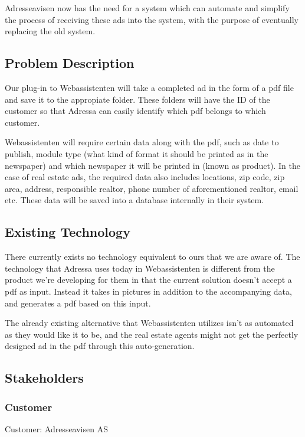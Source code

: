 Adresseavisen now has the need for a system which can automate and simplify the process of receiving these ads into the system, with the purpose of eventually replacing the old system.

\subsection{Problem Description}
Our plug-in to Webassistenten will take a completed ad in the form of a pdf file and save it to the appropiate folder. These folders will have the ID of the customer so that Adressa can easily identify which pdf belongs to which customer.

Webassistenten will require certain data along with the pdf, such as date to publish, module type (what kind of format it should be printed as in the newspaper) and which newspaper it will be printed in (known as product). In the case of real estate ads, the required data also includes locations, zip code, zip area, address, responsible realtor, phone number of aforementioned realtor, email etc. These data will be saved into a database internally in their system. 

\subsection{Existing Technology}
There currently exists no technology equivalent to ours that we are aware of. The technology that Adressa uses today in Webassistenten is different from the product we're developing for them in that the current solution doesn't accept a pdf as input. Instead it takes in pictures in addition to the accompanying data, and generates a pdf based on this input.

The already existing alternative that Webassistenten utilizes isn't as automated as they would like it to be, and the real estate agents might not get the perfectly designed ad in the pdf through this auto-generation.

\subsection{Stakeholders}
\subsubsection{Customer}
Customer: Adresseavisen AS

